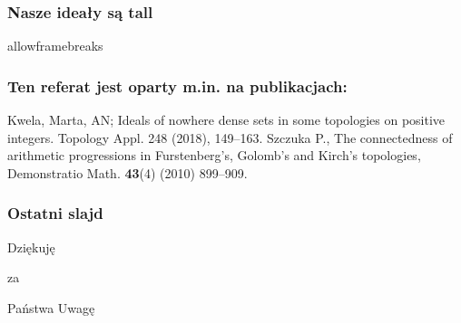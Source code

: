 \documentclass{beamer}
\begin{document}
\begin{frame}\frametitle{Nasze ideały są {\color{red}tall}}
\end{frame}
\begin{frame}[label=bibliografia]{allowframebreaks}
\frametitle{Ten referat jest oparty m.in. na publikacjach:}
\beamertemplatebookbibitems
\begin{thebibliography}{10}{
 {\sc Kwela, Marta, AN;} {Ideals of nowhere dense sets in some topologies on positive integers.} Topology Appl. 248 (2018), 149–163.
}
{\sc Szczuka P.}, {The connectedness of arithmetic progressions in Furstenberg's, Golomb's and Kirch's topologies},
Demonstratio Math. {\bf 43}(4) (2010) 899--909.

\hyperlink{powrot}{}

\end{thebibliography}
\end{frame}

\begin{frame}\frametitle{Ostatni slajd}
\begin{center}{\Huge Dziękuję}\end{center}
\begin{center}{\Huge za}\end{center}
\begin{center}{\Huge Państwa Uwagę}\end{center}
\end{frame}
\end{document}
